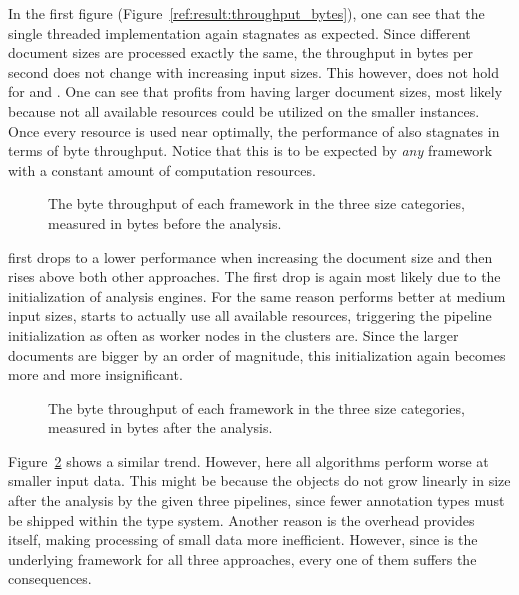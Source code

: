 In the first figure (Figure~\ref{ref:result:throughput_bytes}), one can see that the single threaded implementation again stagnates as expected. Since different document sizes are processed exactly the same, the throughput in bytes per second does not change with increasing input sizes. This however, does not hold for \uimaas{} and \spark{}. One can see that \uimaas{} profits from having larger document sizes, most likely because not all available resources could be utilized on the smaller instances. Once every resource is used near optimally, the performance of \uimaas{} also stagnates in terms of byte throughput. Notice that this is to be expected by \emph{any} framework with a constant amount of computation resources.
\begin{figure}[htb]
	\centering
	\resizebox{1.\linewidth}{!}{\small}
	\caption{The byte throughput of each framework in the three size categories, measured in bytes before the analysis.}
	\label{fig:result:throughput_bytes}
\end{figure}
\spark{} first drops to a lower performance when increasing the document size and then rises above both other approaches. The first drop is again most likely due to the initialization of analysis engines. For the same reason \uimaas{} performs better at medium input sizes, \spark{} starts to actually use all available resources, triggering the pipeline initialization as often as worker nodes in the \spark{} clusters are. Since the larger documents are bigger by an order of magnitude, this initialization again becomes more and more insignificant.
\begin{figure}[htb]
	\centering
	\resizebox{1.\linewidth}{!}{\small}
	\caption{The byte throughput of each framework in the three size categories, measured in bytes after the analysis.}
	\label{fig:result:throughput_bytes_after}
\end{figure}
Figure~\ref{fig:result:throughput_bytes_after} shows a similar trend. However, here all algorithms perform worse at smaller input data. This might be because the \cas{} objects do not grow linearly in size after the analysis by the given three pipelines, since fewer annotation types must be shipped within the type system. Another reason is the overhead \uima{} provides itself, making processing of small data more inefficient. However, since \uima{} is the underlying framework for all three approaches, every one of them suffers the consequences.




